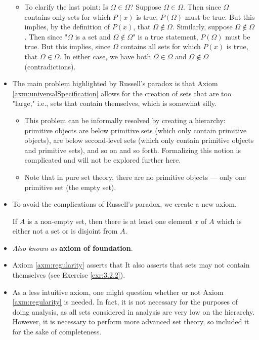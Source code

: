 \documentclass[../main.tex]{subfiles}
\begin{document}
\begin{itemize}
    \begin{itemize}
        \item To clarify the last point: Is $\Omega\in\Omega$? Suppose $\Omega\in\Omega$. Then since $\Omega$ contains only sets for which $P(x)$ is true, $P(\Omega)$ must be true. But this implies, by the definition of $P(x)$, that $\Omega\notin\Omega$. Similarly, suppose $\Omega\notin\Omega$. Then since "$\Omega$ is a set and $\Omega\notin\Omega$" is a true statement, $P(\Omega)$ must be true. But this implies, since $\Omega$ contains all sets for which $P(x)$ is true, that $\Omega\in\Omega$. In either case, we have both $\Omega\in\Omega$ and $\Omega\notin\Omega$ (contradictions).
    \end{itemize}
    \item {}The main problem highlighted by Russell's paradox is that Axiom \ref{axm:universalSpecification} allows for the creation of sets that are too "large," i.e., sets that contain themselves, which is somewhat silly.
    \begin{itemize}
        \item This problem can be informally resolved by creating a hierarchy: primitive objects are below primitive sets (which only contain primitive objects), are below second-level sets (which only contain primitive objects and primitive sets), and so on and so forth. Formalizing this notion is complicated and will not be explored further here.
        \item Note that in pure set theory, there are no primitive objects --- only one primitive set (the empty set).
    \end{itemize}
    \item To avoid the complications of Russell's paradox, we create a new axiom.
    \begin{axm}[Regularity]\label{axm:regularity}
        If $A$ is a non-empty set, then there is at least one element $x$ of $A$ which is either not a set or is disjoint from $A$.
    \end{axm}
    \item \emph{Also known as} \textbf{axiom of foundation}.
    \item Axiom \ref{axm:regularity} asserts that  It also asserts that sets may not contain themselves (see Exercise \ref{exr:3.2.2}).
    \item As a less intuitive axiom, one might question whether or not Axiom \ref{axm:regularity} is needed. In fact, it is not necessary for the purposes of doing analysis, as all sets considered in analysis are very low on the hierarchy. However, it is necessary to perform more advanced set theory, so \cite{bib:AnalysisI} included it for the sake of completeness.
\end{itemize}
\end{document}
